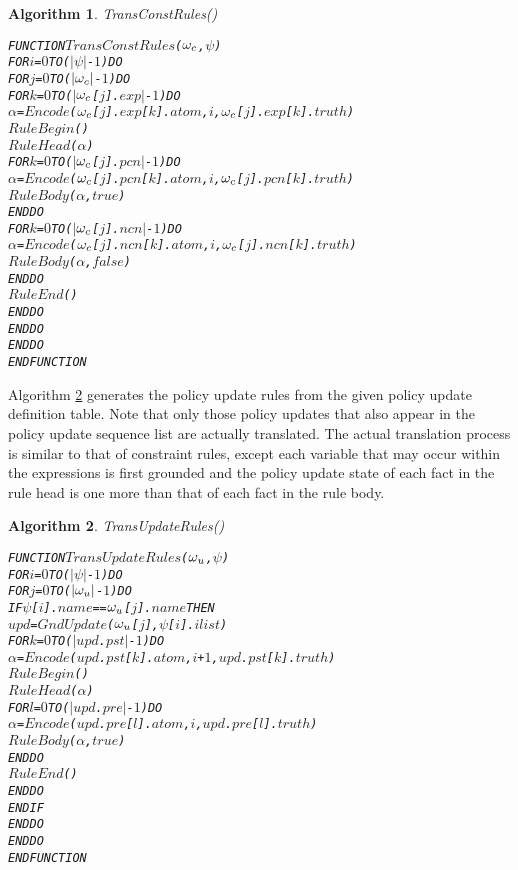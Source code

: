\documentclass[11pt]{report}
\newenvironment{vverbatim}
{
  \begin{alltt}
}
{
    \vspace{-\baselineskip}
  \end{alltt}
}
\newtheorem{vvalgorithm}{Algorithm}[chapter]
\newenvironment{valgorithm}[2]
{
  \begin{vvalgorithm}{#1}
    \label{#2}
    \small
    \begin{vverbatim}
}
{
    \end{vverbatim}
  \end{vvalgorithm}
}
\begin{document}
          \begin{valgorithm}{TransConstRules()}{algo-polup-tconr}
FUNCTION \(TransConstRules\)(\(\omega\sb{c}\), \(\psi\))
  FOR \(i\) = \(0\) TO (\(|\psi|\) - \(1\)) DO
    FOR \(j\) = \(0\) TO (\(|\omega\sb{c}|\) - \(1\)) DO
      FOR \(k\) = \(0\) TO (\(|\)\(\omega\sb{c}\)[\(j\)].\(exp\)\(|\) - \(1\)) DO
        \(\alpha\) = \(Encode\)(\(\omega\sb{c}\)[\(j\)].\(exp\)[\(k\)].\(atom\), \(i\), \(\omega\sb{c}\)[\(j\)].\(exp\)[\(k\)].\(truth\))
        \(RuleBegin\)()
        \(RuleHead\)(\(\alpha\))
        FOR \(k\) = \(0\) TO (\(|\)\(\omega\sb{c}\)[\(j\)].\(pcn\)\(|\) - \(1\)) DO
          \(\alpha\) = \(Encode\)(\(\omega\sb{c}\)[\(j\)].\(pcn\)[\(k\)].\(atom\), \(i\), \(\omega\sb{c}\)[\(j\)].\(pcn\)[\(k\)].\(truth\))
          \(RuleBody\)(\(\alpha\), \(true\))
        ENDDO
        FOR \(k\) = \(0\) TO (\(|\)\(\omega\sb{c}\)[\(j\)].\(ncn\)\(|\) - \(1\)) DO
          \(\alpha\) = \(Encode\)(\(\omega\sb{c}\)[\(j\)].\(ncn\)[\(k\)].\(atom\), \(i\), \(\omega\sb{c}\)[\(j\)].\(ncn\)[\(k\)].\(truth\))
          \(RuleBody\)(\(\alpha\), \(false\))
        ENDDO
        \(RuleEnd\)()
      ENDDO
    ENDDO
  ENDDO
ENDFUNCTION
          \end{valgorithm}

          Algorithm \ref{algo-polup-tupdr} generates the policy update rules
          from the given policy update definition table. Note that only those
          policy updates that also appear in the policy update sequence list
          are actually translated. The actual translation process is similar
          to that of constraint rules, except each variable that may occur
          within the expressions is first grounded and the policy update state
          of each fact in the rule head is one more than that of each fact in
          the rule body.

          \begin{valgorithm}{TransUpdateRules()}{algo-polup-tupdr}
FUNCTION \(TransUpdateRules\)(\(\omega\sb{u}\), \(\psi\))
  FOR \(i\) = \(0\) TO (\(|\psi|\) - \(1\)) DO
    FOR \(j\) = \(0\) TO (\(|\omega\sb{u}|\) - \(1\)) DO
      IF \(\psi\)[\(i\)].\(name\) == \(\omega\sb{u}\)[\(j\)].\(name\) THEN
        \(upd\) = \(GndUpdate\)(\(\omega\sb{u}\)[\(j\)], \(\psi\)[\(i\)].\(ilist\))
        FOR \(k\) = \(0\) TO (\(|\)\(upd\).\(pst\)\(|\) - \(1\)) DO
          \(\alpha\) = \(Encode\)(\(upd\).\(pst\)[\(k\)].\(atom\), \(i\) + \(1\), \(upd\).\(pst\)[\(k\)].\(truth\))
          \(RuleBegin\)()
          \(RuleHead\)(\(\alpha\))
          FOR \(l\) = \(0\) TO (\(|\)\(upd\).\(pre\)\(|\) - \(1\)) DO
            \(\alpha\) = \(Encode\)(\(upd\).\(pre\)[\(l\)].\(atom\), \(i\), \(upd\).\(pre\)[\(l\)].\(truth\))
            \(RuleBody\)(\(\alpha\), \(true\))
          ENDDO
          \(RuleEnd\)()
        ENDDO
      ENDIF
    ENDDO
  ENDDO
ENDFUNCTION
          \end{valgorithm}
\end{document}
